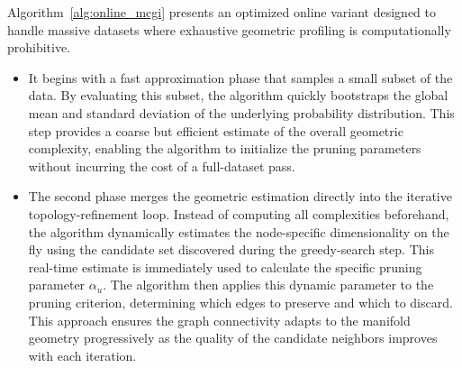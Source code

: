 \documentclass{article}
\theoremstyle{plain}
\theoremstyle{definition}
\theoremstyle{remark}
\begin{document}
Algorithm~\ref{alg:online_mcgi} presents an optimized online variant designed to handle massive datasets where exhaustive geometric profiling is computationally prohibitive. 
\begin{itemize}
    \item It begins with a fast approximation phase that samples a small subset of the data. By evaluating this subset, the algorithm quickly bootstraps the global mean and standard deviation of the underlying probability distribution. This step provides a coarse but efficient estimate of the overall geometric complexity, enabling the algorithm to initialize the pruning parameters without incurring the cost of a full-dataset pass.
    \item The second phase merges the geometric estimation directly into the iterative topology-refinement loop. Instead of computing all complexities beforehand, the algorithm dynamically estimates the node-specific dimensionality on the fly using the candidate set discovered during the greedy-search step. This real-time estimate is immediately used to calculate the specific pruning parameter $\alpha_u$. The algorithm then applies this dynamic parameter to the pruning criterion, determining which edges to preserve and which to discard. This approach ensures the graph connectivity adapts to the manifold geometry progressively as the quality of the candidate neighbors improves with each iteration.
\end{itemize}
\end{document}
